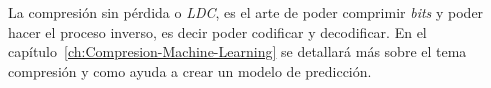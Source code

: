La compresión sin pérdida o \emph{LDC}, es el arte de poder comprimir \emph{bits} y poder hacer el proceso inverso, es decir poder codificar y decodificar. En el capítulo~\ref{ch:Compresion-Machine-Learning} 
se detallará más sobre el tema compresión y como ayuda a crear un modelo de predicción.
